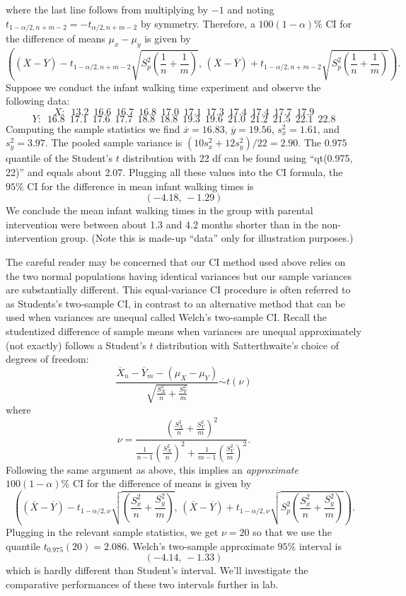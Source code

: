 \documentclass[]{book}
\begin{document}
where the last line follows from multiplying by \(-1\) and noting
\(t_{1-\alpha/2, n+m-2} = -t_{\alpha/2, n+m-2}\) by symmetry. Therefore,
a \(100(1-\alpha)\%\) CI for the difference of means \(\mu_x - \mu_y\)
is given by
\[\left((\overline X - \overline Y)-t_{1-\alpha/2, n+m-2}\sqrt{S_p^2\left(\frac{1}{n} + \frac{1}{m}\right)}, \, (\overline X - \overline Y)+t_{1-\alpha/2, n+m-2}\sqrt{S_p^2\left(\frac{1}{n} + \frac{1}{m}\right)}\right).\]
Suppose we conduct the infant walking time experiment and observe the
following data:
\[X:\,\,\, 13.2\,\,\, 16.6\,\,\, 16.7\,\,\, 16.8\,\,\, 17.0\,\,\, 17.1\,\,\, 17.3\,\,\, 17.4\,\,\, 17.4\,\,\, 17.7\,\,\, 17.9 \]
\[Y: \,\,\, 16.8\,\,\, 17.1\,\,\, 17.6\,\,\, 17.7\,\,\, 18.8\,\,\, 18.8\,\,\, 19.3\,\,\, 19.6\,\,\, 21.0\,\,\, 21.2\,\,\, 21.5\,\,\, 22.1\,\,\, 22.8\]
Computing the sample statistics we find \(\overline x = 16.83\),
\(\overline y = 19.56\), \(s_x^2 = 1.61\), and \(s_y^2 = 3.97\). The
pooled sample variance is \((10s_x^2+12s_y^2)/22 = 2.90\). The \(0.975\)
quantile of the Student's \(t\) distribution with 22 df can be found
using ``qt(0.975, 22)'' and equals about 2.07. Plugging all these values
into the CI formula, the \(95\%\) CI for the difference in mean infant
walking times is\\
\[(-4.18, \, -1.29)\] We conclude the mean infant walking times in the
group with parental intervention were between about 1.3 and 4.2 months
shorter than in the non-intervention group. (Note this is made-up
``data'' only for illustration purposes.)

The careful reader may be concerned that our CI method used above relies
on the two normal populations having identical variances but our sample
variances are substantially different. This equal-variance CI procedure
is often referred to as Students's two-sample CI, in contrast to an
alternative method that can be used when variances are unequal called
Welch's two-sample CI. Recall the studentized difference of sample means
when variances are unequal approximately (not exactly) follows a
Student's \(t\) distribution with Satterthwaite's choice of degrees of
freedom:
\[\frac{\overline X_n - \overline Y_m - (\mu_X - \mu_Y)}{\sqrt{\frac{S_X^2}{n}+\frac{S_Y^2}{m}}}\stackrel{\cdot}{\sim}t(\nu)\]
where
\[\nu = \frac{\left(\frac{S_X^2}{n}+\frac{S_Y^2}{m}\right)^2}{\frac{1}{n-1}\left(\frac{S_X^2}{n}\right)^2 + \frac{1}{m-1}\left(\frac{S_Y^2}{m}\right)^2}.\]
Following the same argument as above, this implies an \emph{approximate}
\(100(1-\alpha)\%\) CI for the difference of means is given by
\[\left((\overline X - \overline Y)-t_{1-\alpha/2, \nu}\sqrt{\left(\frac{S_x^2}{n} + \frac{S_y^2}{m}\right)}, \, (\overline X - \overline Y)+t_{1-\alpha/2, \nu}\sqrt{S_p^2\left(\frac{S_x^2}{n} + \frac{S_y^2}{m}\right)}\right).\]
Plugging in the relevant sample statistics, we get \(\nu = 20\) so that
we use the quantile \(t_{0.975}(20) = 2.086\). Welch's two-sample
approximate \(95\%\) interval is \[(-4.14, \,-1.33)\] which is hardly
different than Student's interval. We'll investigate the comparative
performances of these two intervals further in lab.
\end{document}

